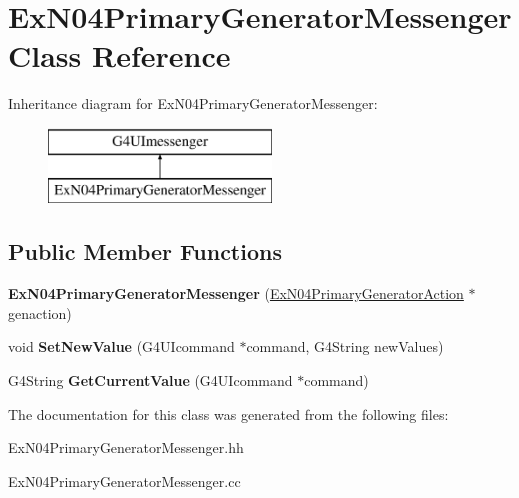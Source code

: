\hypertarget{class_ex_n04_primary_generator_messenger}{}\section{Ex\+N04\+Primary\+Generator\+Messenger Class Reference}
\label{class_ex_n04_primary_generator_messenger}
Inheritance diagram for Ex\+N04\+Primary\+Generator\+Messenger\+:\begin{figure}[H]
\begin{center}
\leavevmode
\includegraphics[height=2.000000cm]{class_ex_n04_primary_generator_messenger}
\end{center}
\end{figure}
\subsection*{Public Member Functions}
\begin{DoxyCompactItemize}
\item 
\hypertarget{class_ex_n04_primary_generator_messenger_aaf4263c261782080d07ca993ba7ee6e2}{}{\bfseries Ex\+N04\+Primary\+Generator\+Messenger} (\hyperlink{class_ex_n04_primary_generator_action}{Ex\+N04\+Primary\+Generator\+Action} $\ast$genaction)\label{class_ex_n04_primary_generator_messenger_aaf4263c261782080d07ca993ba7ee6e2}

\item 
\hypertarget{class_ex_n04_primary_generator_messenger_a4419691c4e4267b5075965ca19b5443e}{}void {\bfseries Set\+New\+Value} (G4\+U\+Icommand $\ast$command, G4\+String new\+Values)\label{class_ex_n04_primary_generator_messenger_a4419691c4e4267b5075965ca19b5443e}

\item 
\hypertarget{class_ex_n04_primary_generator_messenger_a3fe369aa5dc19e59bc8bbfb8db33c34f}{}G4\+String {\bfseries Get\+Current\+Value} (G4\+U\+Icommand $\ast$command)\label{class_ex_n04_primary_generator_messenger_a3fe369aa5dc19e59bc8bbfb8db33c34f}

\end{DoxyCompactItemize}


The documentation for this class was generated from the following files\+:\begin{DoxyCompactItemize}
\item 
Ex\+N04\+Primary\+Generator\+Messenger.\+hh\item 
Ex\+N04\+Primary\+Generator\+Messenger.\+cc\end{DoxyCompactItemize}
